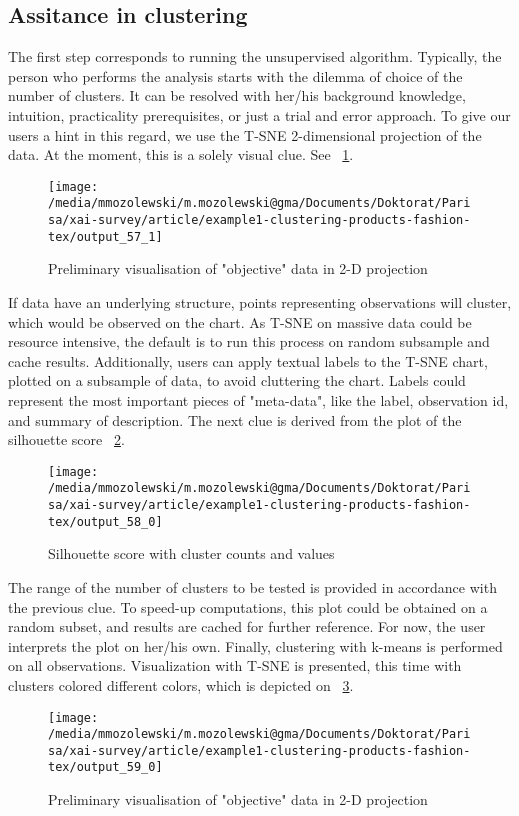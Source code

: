 \documentclass[
 twocolumn,
]{ceurart}
\begin{document}
\subsection{Assitance in clustering}
The first step corresponds to running the unsupervised algorithm.
Typically, the person who performs the analysis starts with the dilemma of choice of the number of clusters.
It can be resolved with her/his background knowledge, intuition, practicality prerequisites, or just a trial and error approach. %
To give our users a hint in this regard, we use the T-SNE 2-dimensional projection of the data.
At the moment, this is a solely visual clue.
See ~\ref{fig:tsne}.
\begin{figure}[h!]
  \centering
  \texttt{[image: /media/mmozolewski/m.mozolewski@gma/Documents/Doktorat/Parisa/xai-survey/article/example1-clustering-products-fashion-tex/output\_57\_1]}
  \caption{Preliminary visualisation of "objective" data in 2-D projection}
  \label{fig:tsne}
\end{figure}
If data have an underlying structure, points representing observations will cluster, which would be observed on the chart.
As T-SNE on massive data could be resource intensive, the default is to run this process on random subsample and cache results.
Additionally, users can apply textual labels to the T-SNE chart, plotted on a subsample of data, to avoid cluttering the chart. %
Labels could represent the most important pieces of "meta-data", like the label, observation id, and summary of description.
The next clue is derived from the plot of the silhouette score ~\ref{fig:silhouette}.
\begin{figure}[h!]
  \centering
  \texttt{[image: /media/mmozolewski/m.mozolewski@gma/Documents/Doktorat/Parisa/xai-survey/article/example1-clustering-products-fashion-tex/output\_58\_0]}
  \caption{Silhouette score with cluster counts and values}
  \label{fig:silhouette}
\end{figure}
The range of the number of clusters to be tested is provided in accordance with the previous clue.
To speed-up computations, this plot could be obtained on a random subset, and results are cached for further reference.
For now, the user interprets the plot on her/his own.
Finally, clustering with k-means is performed on all observations.
Visualization with T-SNE is presented, this time with clusters colored different colors, which is depicted on ~\ref{fig:kmeans}.
\begin{figure}[h!]
  \centering
  \texttt{[image: /media/mmozolewski/m.mozolewski@gma/Documents/Doktorat/Parisa/xai-survey/article/example1-clustering-products-fashion-tex/output\_59\_0]}
  \caption{Preliminary visualisation of "objective" data in 2-D projection}
  \label{fig:kmeans}
\end{figure}
\end{document}
